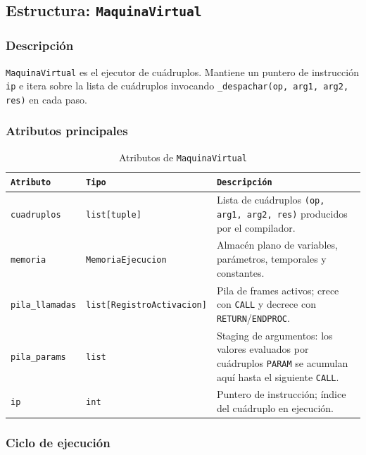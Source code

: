 \documentclass[12pt, letterpaper]{article}
\theoremstyle{definition}
\begin{document}
\subsection{Estructura: \texttt{MaquinaVirtual}}

\subsubsection*{Descripción}

\texttt{MaquinaVirtual} es el ejecutor de cuádruplos. Mantiene un puntero de instrucción \texttt{ip} e itera sobre la lista de cuádruplos invocando \texttt{\_despachar(op, arg1, arg2, res)} en cada paso.

\subsubsection*{Atributos principales}

\begin{table}[H]
\centering
\caption{Atributos de \texttt{MaquinaVirtual}}
\label{tab:mv-atributos}
\begin{tabular}{|p{3.5cm}|p{3.5cm}|p{6cm}|}
    \hline
    \texttt{Atributo} & \texttt{Tipo} & \texttt{Descripción} \\ \hline
    \texttt{cuadruplos} & \texttt{list[tuple]} &
    Lista de cuádruplos \texttt{(op,\,arg1,\,arg2,\,res)} producidos por el compilador. \\ \hline
    \texttt{memoria} & \texttt{MemoriaEjecucion} &
    Almacén plano de variables, parámetros, temporales y constantes. \\ \hline
    \texttt{pila\_llamadas} & \texttt{list[Registro\-Activacion]} &
    Pila de frames activos; crece con \texttt{CALL} y decrece con \texttt{RETURN}/\texttt{ENDPROC}. \\ \hline
    \texttt{pila\_params} & \texttt{list} &
    Staging de argumentos: los valores evaluados por cuádruplos \texttt{PARAM} se acumulan aquí hasta el siguiente \texttt{CALL}. \\ \hline
    \texttt{ip} & \texttt{int} &
    Puntero de instrucción; índice del cuádruplo en ejecución. \\ \hline
\end{tabular}
\end{table}

\subsubsection*{Ciclo de ejecución}
\end{document}
